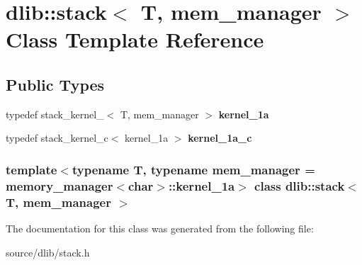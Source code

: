 \hypertarget{classdlib_1_1stack}{
\section{dlib::stack$<$ T, mem\_\-manager $>$ Class Template Reference}
\label{classdlib_1_1stack}
}
\subsection*{Public Types}
\begin{DoxyCompactItemize}
\item 
\hypertarget{classdlib_1_1stack_a7696878e1040d1639c63d0bfd2b829b2}{
typedef stack\_\-kernel\_$<$ T, mem\_\-manager $>$ {\bfseries kernel\_\-1a}}
\label{classdlib_1_1stack_a7696878e1040d1639c63d0bfd2b829b2}

\item 
\hypertarget{classdlib_1_1stack_a0632f6142cbe703f907a27240f09c248}{
typedef stack\_\-kernel\_\-c$<$ kernel\_\-1a $>$ {\bfseries kernel\_\-1a\_\-c}}
\label{classdlib_1_1stack_a0632f6142cbe703f907a27240f09c248}

\end{DoxyCompactItemize}
\subsubsection*{template$<$typename T, typename mem\_\-manager = memory\_\-manager$<$char$>$::kernel\_\-1a$>$ class dlib::stack$<$ T, mem\_\-manager $>$}



The documentation for this class was generated from the following file:\begin{DoxyCompactItemize}
\item 
source/dlib/stack.h\end{DoxyCompactItemize}
